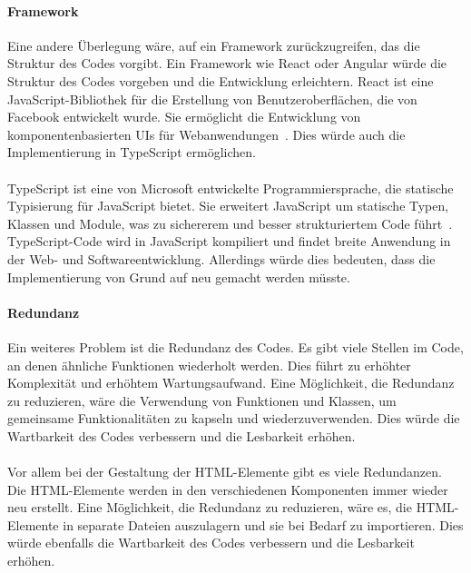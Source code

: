 \paragraph{Framework}
Eine andere Überlegung wäre, auf ein Framework zurückzugreifen, das die Struktur des Codes vorgibt. Ein Framework wie React oder Angular würde die Struktur des Codes vorgeben und die Entwicklung erleichtern. React ist eine JavaScript-Bibliothek für die Erstellung von Benutzeroberflächen, die von Facebook entwickelt wurde. Sie ermöglicht die Entwicklung von komponentenbasierten UIs für Webanwendungen~\cite{react}. Dies würde auch die Implementierung in TypeScript ermöglichen.

\paragraph{}
TypeScript ist eine von Microsoft entwickelte Programmiersprache, die statische Typisierung für JavaScript bietet. Sie erweitert JavaScript um statische Typen, Klassen und Module, was zu sichererem und besser strukturiertem Code führt~\cite{typescript}. TypeScript-Code wird in JavaScript kompiliert und findet breite Anwendung in der Web- und Softwareentwicklung. Allerdings würde dies bedeuten, dass die Implementierung von Grund auf neu gemacht werden müsste.

\paragraph{Redundanz}
Ein weiteres Problem ist die Redundanz des Codes. Es gibt viele Stellen im Code, an denen ähnliche Funktionen wiederholt werden. Dies führt zu erhöhter Komplexität und erhöhtem Wartungsaufwand. Eine Möglichkeit, die Redundanz zu reduzieren, wäre die Verwendung von Funktionen und Klassen, um gemeinsame Funktionalitäten zu kapseln und wiederzuverwenden. Dies würde die Wartbarkeit des Codes verbessern und die Lesbarkeit erhöhen.

\paragraph{}
Vor allem bei der Gestaltung der HTML-Elemente gibt es viele Redundanzen. Die HTML-Elemente werden in den verschiedenen Komponenten immer wieder neu erstellt. Eine Möglichkeit, die Redundanz zu reduzieren, wäre es, die HTML-Elemente in separate Dateien auszulagern und sie bei Bedarf zu importieren. Dies würde ebenfalls die Wartbarkeit des Codes verbessern und die Lesbarkeit erhöhen.